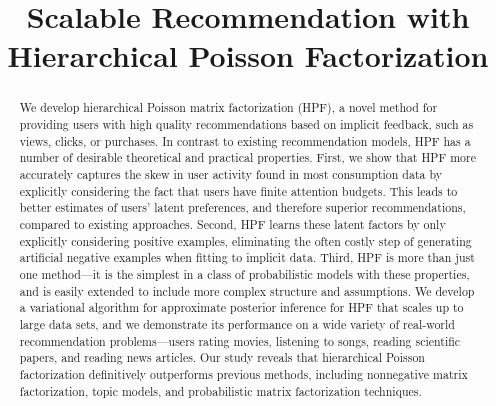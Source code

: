 



\title{Scalable Recommendation with Hierarchical Poisson Factorization}

\author{} %

%



\maketitle

\begin{abstract}
We develop hierarchical Poisson matrix factorization (HPF), a novel
method for providing users with high quality recommendations based on
implicit feedback, such as views, clicks, or purchases.  In contrast
to existing recommendation models, HPF has a number of desirable
theoretical and practical properties.  First, we show that HPF more
accurately captures the skew in user activity found in most
consumption data by explicitly considering the fact that users have
finite attention budgets.  This leads to better estimates of users'
latent preferences, and therefore superior recommendations, compared
to existing approaches.  Second, HPF learns these latent factors by
only explicitly considering positive examples, eliminating the often
costly step of generating artificial negative examples when fitting to
implicit data.  Third, HPF is more than just one method---it is the
simplest in a class of probabilistic models with these properties, and
is easily extended to include more complex structure and assumptions.
We develop a variational algorithm for approximate posterior inference
for HPF that scales up to large data sets, and we demonstrate its
performance on a wide variety of real-world recommendation
problems---users rating movies, listening to songs, reading
scientific papers, and reading news articles.  Our study reveals
that hierarchical Poisson factorization definitively outperforms
previous methods, including nonnegative matrix factorization, topic
models, and probabilistic matrix factorization techniques.
\end{abstract}

